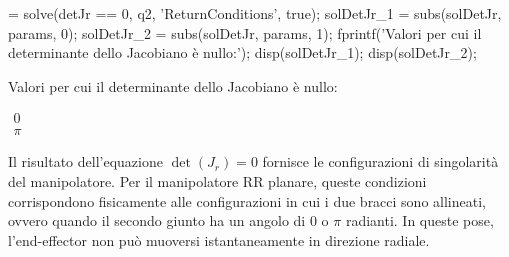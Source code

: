 \documentclass[11pt, a4paper]{article}
\begin{document}
\begin{matlabcode}
 = solve(detJr == 0, q2, 'ReturnConditions', true);
solDetJr_1 = subs(solDetJr, params, 0);
solDetJr_2 = subs(solDetJr, params, 1);
fprintf('Valori per cui il determinante dello Jacobiano è nullo:');
disp(solDetJr_1);
disp(solDetJr_2);
\end{matlabcode}
\begin{matlaboutput}
Valori per cui il determinante dello Jacobiano è nullo:
\end{matlaboutput}
\begin{matlabsymbolicoutput}
$\displaystyle
\begin{matrix}
0\\
\pi
\end{matrix}
$
\end{matlabsymbolicoutput}
\begin{par}
\begin{flushleft}
Il risultato dell'equazione $\det(J_r )=0$ fornisce le configurazioni di singolarità del manipolatore. Per il manipolatore RR planare, queste condizioni corrispondono fisicamente alle configurazioni in cui i due bracci sono allineati, ovvero quando il secondo giunto ha un angolo di 0 o $\pi$ radianti. In queste pose, l'end-effector non può muoversi istantaneamente in direzione radiale.
\end{flushleft}
\end{par}

\end{document}
